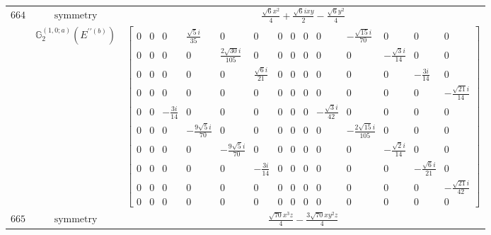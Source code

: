 \documentclass[fleqn,8pt,landscape]{jsarticle}
\begin{document}
\begin{longtable}{ccc}
$ 664 $ & $ \text{symmetry} $ & $ \frac{\sqrt{6} x^{2}}{4} + \frac{\sqrt{6} i x y}{2} - \frac{\sqrt{6} y^{2}}{4} $ \\
$  $ & $ \mathbb{G}_{2}^{(1,0;a)}(E^{\prime\prime(b)}) $ & $ \begin{bmatrix} 0 & 0 & 0 & \frac{\sqrt{5} i}{35} & 0 & 0 & 0 & 0 & 0 & 0 & - \frac{\sqrt{15} i}{70} & 0 & 0 & 0 \\ 0 & 0 & 0 & 0 & \frac{2 \sqrt{30} i}{105} & 0 & 0 & 0 & 0 & 0 & 0 & - \frac{\sqrt{3} i}{14} & 0 & 0 \\ 0 & 0 & 0 & 0 & 0 & \frac{\sqrt{6} i}{21} & 0 & 0 & 0 & 0 & 0 & 0 & - \frac{3 i}{14} & 0 \\ 0 & 0 & 0 & 0 & 0 & 0 & 0 & 0 & 0 & 0 & 0 & 0 & 0 & - \frac{\sqrt{21} i}{14} \\ 0 & 0 & - \frac{3 i}{14} & 0 & 0 & 0 & 0 & 0 & 0 & - \frac{\sqrt{3} i}{42} & 0 & 0 & 0 & 0 \\ 0 & 0 & 0 & - \frac{9 \sqrt{5} i}{70} & 0 & 0 & 0 & 0 & 0 & 0 & - \frac{2 \sqrt{15} i}{105} & 0 & 0 & 0 \\ 0 & 0 & 0 & 0 & - \frac{9 \sqrt{5} i}{70} & 0 & 0 & 0 & 0 & 0 & 0 & - \frac{\sqrt{2} i}{14} & 0 & 0 \\ 0 & 0 & 0 & 0 & 0 & - \frac{3 i}{14} & 0 & 0 & 0 & 0 & 0 & 0 & - \frac{\sqrt{6} i}{21} & 0 \\ 0 & 0 & 0 & 0 & 0 & 0 & 0 & 0 & 0 & 0 & 0 & 0 & 0 & - \frac{\sqrt{21} i}{42} \\ 0 & 0 & 0 & 0 & 0 & 0 & 0 & 0 & 0 & 0 & 0 & 0 & 0 & 0 \end{bmatrix} $ \\ \hline
$ 665 $ & $ \text{symmetry} $ & $ \frac{\sqrt{70} x^{3} z}{4} - \frac{3 \sqrt{70} x y^{2} z}{4} $ \\

\end{longtable}
\end{document}
